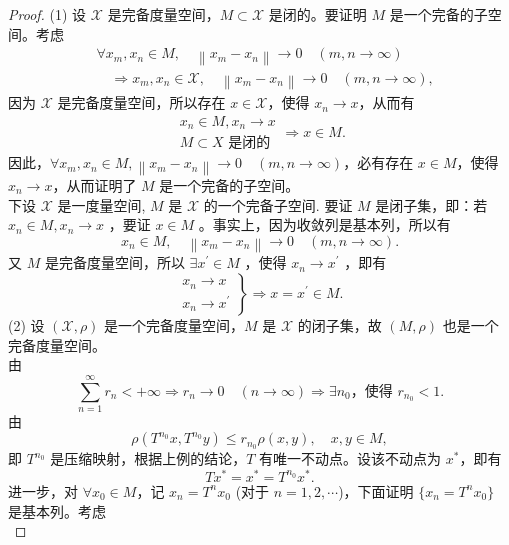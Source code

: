 \documentclass[lang=cn,newtx,10pt,scheme=chinese,thmcnt=chapter]{elegantbook}
\begin{document}
\begin{proof}
(1) 设 \( \mathscr{X} \) 是完备度量空间，\( M \subset \mathscr{X} \) 是闭的。要证明 \( M \) 是一个完备的子空间。考虑
\[
\begin{aligned}
& \forall x_m, x_n \in M, \quad \left\| x_m - x_n \right\| \to 0 \quad (m, n \to \infty) \\
& \quad \Longrightarrow x_m, x_n \in \mathscr{X}, \quad \left\| x_m - x_n \right\| \to 0 \quad (m, n \to \infty),
\end{aligned}
\]
因为 \( \mathscr{X} \) 是完备度量空间，所以存在 \( x \in \mathscr{X} \)，使得 \( x_n \to x \)，从而有
\[
\begin{array}{l}
x_n \in M, x_n \to x \\
M \subset X \text{ 是闭的}
\end{array}
\Rightarrow x \in M.
\]
因此，\( \forall x_m, x_n \in M, \left\| x_m - x_n \right\| \to 0 \quad (m, n \to \infty) \)，必有存在 \( x \in M \)，使得 \( x_n \to x \)，从而证明了 \( M \) 是一个完备的子空间。\\
下设 $\mathscr{X}$ 是一度量空间, $M$ 是 $\mathscr{X}$ 的一个完备子空间. 要证 $M$ 是闭子集，即：若 $x_n \in M, x_n \rightarrow x$ ，要证 $x \in M$ 。事实上，因为收敛列是基本列，所以有
\begin{equation*}
x_n \in M, \quad\left\|x_m-x_n\right\| \rightarrow 0 \quad(m, n \rightarrow \infty) .
\end{equation*}
又 $M$ 是完备度量空间，所以 $\exists x^{\prime} \in M$ ，使得 $x_n \rightarrow x^{\prime}$ ，即有
\begin{equation*}
\left.\begin{array}{l}
x_n \rightarrow x \\
x_n \rightarrow x^{\prime}
\end{array}\right\} \Rightarrow x=x^{\prime} \in M .
\end{equation*}
(2) 设 \( (\mathscr{X}, \rho) \) 是一个完备度量空间，\( M \) 是 \( \mathscr{X} \) 的闭子集，故 \( (M, \rho) \) 也是一个完备度量空间。\\
由
\[
\sum_{n=1}^{\infty} r_n < +\infty \Longrightarrow r_n \to 0 \quad (n \to \infty) \Longrightarrow \exists n_0 \text{，使得 } r_{n_0} < 1.
\]
由
\[
\rho(T^{n_0} x, T^{n_0} y) \leqslant r_{n_0} \rho(x, y), \quad x, y \in M,
\]
即 \( T^{n_0} \) 是压缩映射，根据上例的结论，\( T \) 有唯一不动点。设该不动点为 \( x^* \)，即有
\[
T x^* = x^* = T^{n_0} x^*.
\]
进一步，对 \( \forall x_0 \in M \)，记 \( x_n = T^n x_0 \) (对于 \( n = 1, 2, \cdots \))，下面证明 \( \{ x_n = T^n x_0 \} \) 是基本列。考虑
\[
\]
\end{proof}
\end{document}
